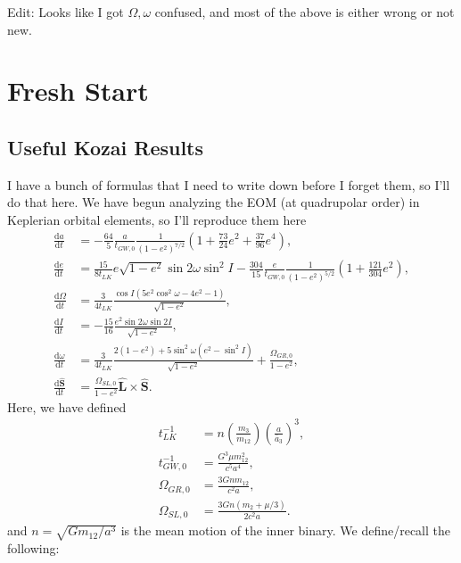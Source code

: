 \documentclass[11pt,
        usenames, %
        dvipsnames %
    ]{article}
\newcommand*{\rd}[2]{\frac{\mathrm{d}#1}{\mathrm{d}#2}}
\newcommand*{\bm}[1]{\boldsymbol{\mathbf{#1}}}
\newcommand*{\p}[1]{\left(#1\right)}
\begin{document}
Edit: Looks like I got $\Omega, \omega$ confused, and most of the above is
either wrong or not new.

\section{Fresh Start}

\subsection{Useful Kozai Results}

I have a bunch of formulas that I need to write down before I forget them, so
I'll do that here. We have begun analyzing the EOM (at quadrupolar order) in
Keplerian orbital elements, so I'll reproduce them here
\begin{align}
    \rd{a}{t} &= -\frac{64}{5}\frac{a}{t_{GW,0}} \frac{1}{\p{1 - e^2}^{7/2}}
        \p{1 + \frac{73}{24}e^2 + \frac{37}{96}e^4},\\
    \rd{e}{t} &= \frac{15}{8t_{LK}} e\sqrt{1 - e^2}\sin 2\omega
        \sin^2 I - \frac{304}{15}\frac{e}{t_{GW, 0}}\frac{1}{\p{1 - e^2}^{5/2}}
            \p{1 + \frac{121}{304}e^2},\\
    \rd{\Omega}{t} &= \frac{3}{4t_{LK}}
        \frac{\cos I\p{5e^2 \cos^2\omega - 4e^2 - 1}}{\sqrt{1 - e^2}},\\
    \rd{I}{t} &= -\frac{15}{16}\frac{e^2\sin 2\omega \sin 2I}{
        \sqrt{1 - e^2}},\\
    \rd{\omega}{t} &= \frac{3}{4t_{LK}}
        \frac{2\p{1 - e^2} + 5\sin^2\omega
            (e^2 - \sin^2 I)}{\sqrt{1 - e^2}} + \frac{\Omega_{GR,0}}{1 - e^2},\\
    \rd{\hat{\bm{S}}}{t} &= \frac{\Omega_{SL,0}}{1 - e^2}\hat{\bm{L}} \times \hat{\bm{S}}.
\end{align}
Here, we have defined
\begin{align}
    t_{LK}^{-1} &= n\p{\frac{m_3}{m_{12}}}\p{\frac{a}{\bar{a}_3}}^3,\\
    t_{GW,0}^{-1} &= \frac{G^3 \mu m_{12}^2}{c^5a^4},\\
    \Omega_{GR,0} &= \frac{3Gnm_{12}}{c^2a},\\
    \Omega_{SL,0} &= \frac{3Gn\p{m_2 + \mu/3}}{2c^2a}.
\end{align}
and $n = \sqrt{Gm_{12}/a^3}$ is the mean motion of the inner binary. We
define/recall the following:
\end{document}
